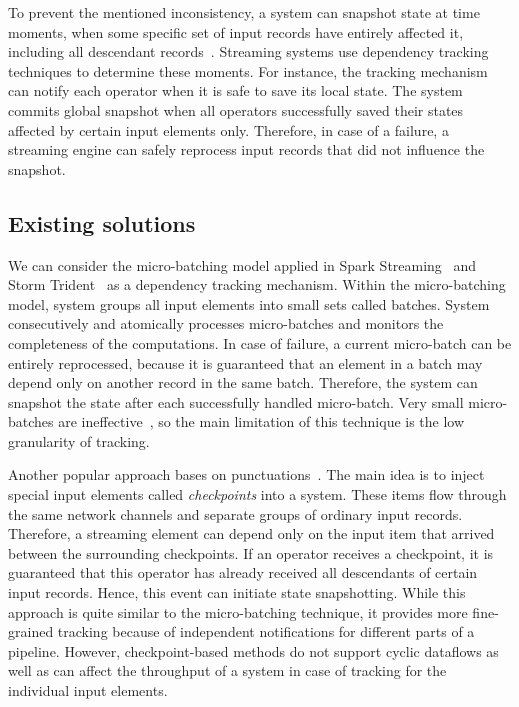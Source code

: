To prevent the mentioned inconsistency, a system can snapshot state at time moments, when some specific set of input records have entirely affected it, including all descendant records~\cite{2015arXiv150608603C, thepaper}. Streaming systems use dependency tracking techniques to determine these moments. For instance, the tracking mechanism can notify each operator when it is safe to save its local state. The system commits global snapshot when all operators successfully saved their states affected by certain input elements only. Therefore, in case of a failure, a streaming engine can safely reprocess input records that did not influence the snapshot.

\subsection{Existing solutions}
We can consider the micro-batching model applied in Spark Streaming~\cite{Zaharia:2012:DSE:2342763.2342773} and Storm Trident~\cite{apache:storm:trident} as a dependency tracking mechanism. Within the micro-batching model, system groups all input elements into small sets called batches. System consecutively and atomically processes micro-batches and monitors the completeness of the computations. In case of failure, a current micro-batch can be entirely reprocessed, because it is guaranteed that an element in a batch may depend only on another record in the same batch. Therefore, the system can snapshot the state after each successfully handled micro-batch. Very small micro-batches are ineffective~\cite{Zaharia:2012:DSE:2342763.2342773}, so the main limitation of this technique is the low granularity of tracking.

Another popular approach bases on punctuations~\cite{Tucker:2003:EPS:776752.776780}. The main idea is to inject special input elements called {\em checkpoints} into a system. These items flow through the same network channels and separate groups of ordinary input records. Therefore, a streaming element can depend only on the input item that arrived between the surrounding checkpoints. If an operator receives a checkpoint, it is guaranteed that this operator has already received all descendants of certain input records. Hence, this event can initiate state snapshotting. While this approach is quite similar to the micro-batching technique, it provides more fine-grained tracking because of independent notifications for different parts of a pipeline. However, checkpoint-based methods do not support cyclic dataflows as well as can affect the throughput of a system in case of tracking for the individual input elements.

\acker\ 